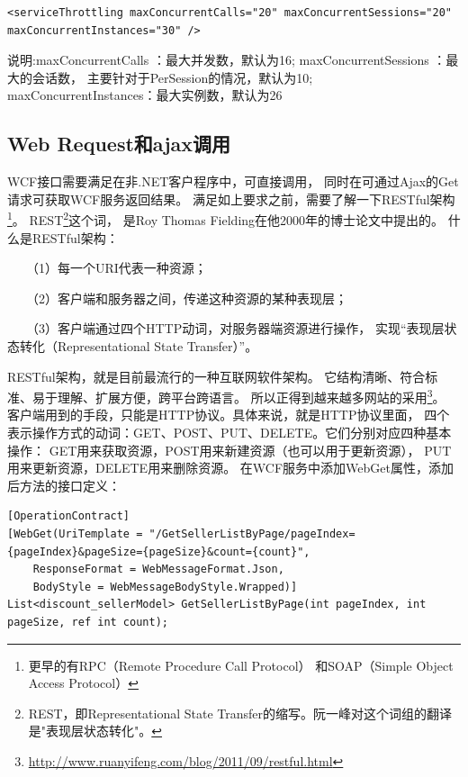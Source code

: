 \documentclass{book}
\begin{document}
\begin{lstlisting}
<serviceThrottling maxConcurrentCalls="20" maxConcurrentSessions="20" maxConcurrentInstances="30" />
\end{lstlisting}

说明:maxConcurrentCalls ：最大并发数，默认为16;
maxConcurrentSessions ：最大的会话数，
主要针对于PerSession的情况，默认为10;
maxConcurrentInstances：最大实例数，默认为26

\subsection{Web Request和ajax调用}

WCF接口需要满足在非.NET客户程序中，可直接调用，
同时在可通过Ajax的Get请求可获取WCF服务返回结果。
满足如上要求之前，需要了解一下RESTful架构\footnote{更早的有RPC（Remote Procedure Call Protocol）
和SOAP（Simple Object Access Protocol）}。
REST\footnote{REST，即Representational State Transfer的缩写。阮一峰对这个词组的翻译是"表现层状态转化"。}这个词，
是Roy Thomas Fielding在他2000年的博士论文中提出的。
什么是RESTful架构：

　　（1）每一个URI代表一种资源；

　　（2）客户端和服务器之间，传递这种资源的某种表现层；

　　（3）客户端通过四个HTTP动词，对服务器端资源进行操作，
实现“表现层状态转化（Representational State Transfer）”。

RESTful架构，就是目前最流行的一种互联网软件架构。
它结构清晰、符合标准、易于理解、扩展方便，跨平台跨语言。
所以正得到越来越多网站的采用\footnote{\url{http://www.ruanyifeng.com/blog/2011/09/restful.html}}。
客户端用到的手段，只能是HTTP协议。具体来说，就是HTTP协议里面，
四个表示操作方式的动词：GET、POST、PUT、DELETE。它们分别对应四种基本操作：
GET用来获取资源，POST用来新建资源（也可以用于更新资源），
PUT用来更新资源，DELETE用来删除资源。
在WCF服务中添加WebGet属性，添加后方法的接口定义：

\begin{lstlisting}[language={[Sharp]C}]
[OperationContract]
[WebGet(UriTemplate = "/GetSellerListByPage/pageIndex={pageIndex}&pageSize={pageSize}&count={count}",
    ResponseFormat = WebMessageFormat.Json,
    BodyStyle = WebMessageBodyStyle.Wrapped)]
List<discount_sellerModel> GetSellerListByPage(int pageIndex, int pageSize, ref int count);
\end{lstlisting}
\end{document}
